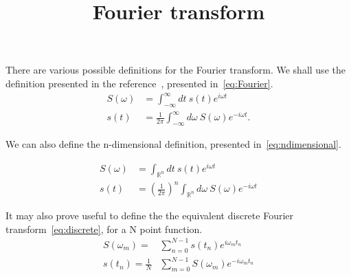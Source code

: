 \documentclass{article}
\begin{document}
\title{Fourier transform}
\maketitle

There are various possible definitions for the Fourier transform. We shall use the definition presented in the reference~\cite{agrawal1992fiber}, presented in~\eqref{eq:Fourier}.
\begin{subequations}\label{eq:Fourier}
\begin{align}
S(\omega)&=\int_{-\infty}^{\infty}dt~s(t)e^{i\omega t}\\
s(t)&=\frac{1}{2\pi}\int_{-\infty}^{\infty}d\omega~ S(\omega)e^{-i\omega t}.
\end{align}
\end{subequations}

We can also define the n-dimensional definition, presented in~\eqref{eq:ndimensional}.

\begin{subequations}\label{eq:ndimensional}
\begin{align}
S(\omega)&=\int_{\mathbb{R}^n}dt~s(t)e^{i\omega t}\\
s(t)&=\left(\frac{1}{2\pi}\right)^n\int_{\mathbb{R}^n}d\omega~S(\omega)e^{-i\omega t}
\end{align}
\end{subequations}

It may also prove useful to define the the equivalent discrete Fourier transform~\eqref{eq:discrete}, for a N point function.
\begin{subequations}\label{eq:discrete}
\begin{align}
S(\omega_m)=&\sum_{n=0}^{N-1} s(t_n)e^{i\omega_m t_n}\\
s(t_n)=\frac{1}{N}&\sum_{m=0}^{N-1}S(\omega_m)e^{-i\omega_m t_n}
\end{align}
\end{subequations}



\end{document}

